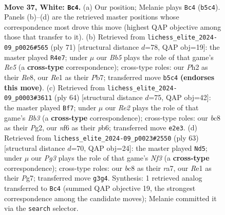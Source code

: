 \documentclass[11pt]{article}
\begin{document}
\clearpage

\begin{figure}[p]\centering
\begin{subfigure}{0.46\textwidth}\centering
\resizebox{\linewidth}{!}{%
\newchessgame
\chessboard[
  setfen={2b2k2/1r3p2/3q1np1/1B4Np/P7/6P1/1p1NRP1P/4R1K1 w - - 2 37},
  showmover=false,
  pgfstyle=straightmove, color=movearrow, markmove={b5-c4}
]}
\caption{}
\end{subfigure}\hfill
\begin{subfigure}{0.46\textwidth}\centering
\resizebox{\linewidth}{!}{%
\newchessgame
\chessboard[
  setfen={4r3/1p1b2B1/1nk4p/p4p2/4r1p1/N1P3P1/P1B2P1P/3R1K2 b - - 9 36},
  showmover=false,
  pgfstyle=straightmove, color=movearrow, markmove={e4-e7}
]}
\caption{}
\end{subfigure}
\\[4pt]
\begin{subfigure}{0.46\textwidth}\centering
\resizebox{\linewidth}{!}{%
\newchessgame
\chessboard[
  setfen={4N2k/6pp/1p1B2n1/p7/P2q4/1B4RP/2P2PPK/8 w - - 3 33},
  showmover=false,
  pgfstyle=straightmove, color=movearrow, markmove={b3-f7}
]}
\caption{}
\end{subfigure}\hfill
\begin{subfigure}{0.46\textwidth}\centering
\resizebox{\linewidth}{!}{%
\newchessgame
\chessboard[
  setfen={8/R4pp1/P1p1bnk1/2r5/7p/4QP2/2r1N1P1/6K1 b - - 3 32},
  showmover=false,
  pgfstyle=straightmove, color=movearrow, markmove={f6-d5}
]}
\caption{}
\end{subfigure}
\caption{\textbf{Move 37, White: \texttt{Bc4}.} (a) Our position; Melanie plays \texttt{Bc4} (\texttt{b5c4}). Panels (b)--(d) are the retrieved master positions whose correspondence most drove this move (highest QAP objective among those that transfer to it). (b) Retrieved from \texttt{lichess\_elite\_2024-09\_p0026\#565} (ply 71) [structural distance $d$=78, QAP obj=19]: the master played \texttt{R4e7}; under $\mu$ our \emph{Bb5} plays the role of that game's \emph{Re5} (a \textbf{cross-type} correspondence); cross-type roles: our \emph{P}h2 as their \emph{R}e8, our \emph{R}e1 as their \emph{P}b7; transferred move \texttt{b5c4} \textbf{(endorses this move)}. (c) Retrieved from \texttt{lichess\_elite\_2024-09\_p0003\#3611} (ply 64) [structural distance $d$=75, QAP obj=42]: the master played \texttt{Bf7}; under $\mu$ our \emph{Re2} plays the role of that game's \emph{Bb3} (a \textbf{cross-type} correspondence); cross-type roles: our \emph{b}c8 as their \emph{P}g2, our \emph{n}f6 as their \emph{p}b6; transferred move \texttt{e2e3}. (d) Retrieved from \texttt{lichess\_elite\_2024-09\_p0023\#2550} (ply 63) [structural distance $d$=70, QAP obj=24]: the master played \texttt{Nd5}; under $\mu$ our \emph{Pg3} plays the role of that game's \emph{Nf3} (a \textbf{cross-type} correspondence); cross-type roles: our \emph{b}c8 as their \emph{r}a7, our \emph{R}e1 as their \emph{P}g7; transferred move \texttt{g3g4}. Synthesis: 1 retrieved analog transferred to \texttt{Bc4} (summed QAP objective 19, the strongest correspondence among the candidate moves); Melanie committed it via the \texttt{search} selector.}
\label{fig:thought-m72}
\end{figure}
\end{document}
